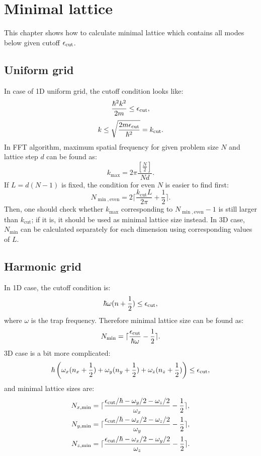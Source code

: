 \section{Minimal lattice}

This chapter shows how to calculate minimal lattice which contains all modes below given cutoff $\epsilon_{\mathrm{cut}}$.


\subsection{Uniform grid}

In case of 1D uniform grid, the cutoff condition looks like:
\[
	\frac{\hbar^2 k^2}{2 m} \le \epsilon_{\mathrm{cut}},
\]
\[
	k \le \sqrt{\frac{2 m \epsilon_{\mathrm{cut}}}{\hbar^2}} = k_{\mathrm{cut}}.
\]
In FFT algorithm, maximum spatial frequency for given problem size $N$ and lattice step $d$ can be found as:
\[
	k_{\max} = 2 \pi \frac{ \left[ \frac{N}{2} \right] }{N d}.
\]
If $L = d (N - 1)$ is fixed, the condition for even $N$ is easier to find first:
\[
	N_{\min,\mathrm{even}} = 2 \lceil
		\frac{k_{\mathrm{cut}} L}{2 \pi} + \frac{1}{2}
	\rceil.
\]
Then, one should check whether $k_{\max}$ corresponding to $N_{\min,\mathrm{even}} - 1$ is still larger than $k_{\mathrm{cut}}$; if it is, it should be used as minimal lattice size instead.
In 3D case, $N_{\min}$ can be calculated separately for each dimension using corresponding values of $L$.


\subsection{Harmonic grid}

In 1D case, the cutoff condition is:
\[
	\hbar \omega ( n + \frac{1}{2} ) \le \epsilon_{\mathrm{cut}},
\]
where $\omega$ is the trap frequency.
Therefore minimal lattice size can be found as:
\[
	N_{\min} = \lceil \frac{\epsilon_{\mathrm{cut}}}{\hbar \omega} - \frac{1}{2} \rceil.
\]
3D case is a bit more complicated:
\[
	\hbar \left(
		\omega_x (n_x + \frac{1}{2})
		+ \omega_y (n_y + \frac{1}{2})
		+ \omega_z (n_z + \frac{1}{2})
	\right) \le \epsilon_{\mathrm{cut}},
\]
and minimal lattice sizes are:
\begin{equation*}
\begin{split}
	N_{x,\min} & = \lceil
		\frac{\epsilon_{\mathrm{cut}} / \hbar - \omega_y / 2 - \omega_z / 2}{\omega_x} - \frac{1}{2}
	\rceil, \\
	N_{y,\min} & = \lceil
		\frac{\epsilon_{\mathrm{cut}} / \hbar - \omega_x / 2 - \omega_z / 2}{\omega_y} - \frac{1}{2}
	\rceil, \\
	N_{z,\min} & = \lceil
		\frac{\epsilon_{\mathrm{cut}} / \hbar - \omega_x / 2 - \omega_y / 2}{\omega_z} - \frac{1}{2}
	\rceil.
\end{split}
\end{equation*}
